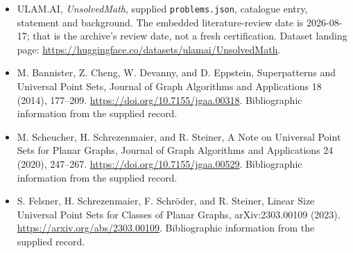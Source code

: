 \documentclass[11pt,a4paper]{article}
\begin{document}
{\small

\begin{itemize}

\item[\hypertarget{source:statement:1}{S1}] ULAM.AI, \emph{UnsolvedMath}, supplied \texttt{problems.json}, catalogue entry, statement and background. The embedded literature-review date is 2026-08-17; that is the archive’s review date, not a fresh certification. Dataset landing page: \url{https://huggingface.co/datasets/ulamai/UnsolvedMath}.

\item[\hypertarget{source:statement:2}{S2}] M. Bannister, Z. Cheng, W. Devanny, and D. Eppstein, Superpatterns and Universal Point Sets, Journal of Graph Algorithms and Applications 18 (2014), 177–209. \url{https://doi.org/10.7155/jgaa.00318}. Bibliographic information from the supplied record.

\item[\hypertarget{source:statement:3}{S3}] M. Scheucher, H. Schrezenmaier, and R. Steiner, A Note on Universal Point Sets for Planar Graphs, Journal of Graph Algorithms and Applications 24 (2020), 247–267. \url{https://doi.org/10.7155/jgaa.00529}. Bibliographic information from the supplied record.

\item[\hypertarget{source:statement:4}{S4}] S. Felsner, H. Schrezenmaier, F. Schröder, and R. Steiner, Linear Size Universal Point Sets for Classes of Planar Graphs, arXiv:2303.00109 (2023). \url{https://arxiv.org/abs/2303.00109}. Bibliographic information from the supplied record.

\end{itemize}

}

\label{end:statement}
\end{document}
